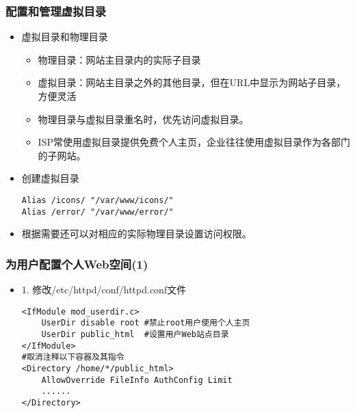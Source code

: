 \documentclass[xcolor=svgnames,presentation]{beamer}
\begin{document}
\begin{frame}[fragile]
\frametitle{配置和管理虚拟目录}
\label{sec-1-14}
\begin{itemize}

\item 虚拟目录和物理目录
\label{sec-1-14-1}%
\begin{itemize}

\item 物理目录：网站主目录内的实际子目录
\label{sec-1-14-1-1}%

\item 虚拟目录：网站主目录之外的其他目录，但在URL中显示为网站子目录，方便灵活
\label{sec-1-14-1-2}%

\item 物理目录与虚拟目录重名时，优先访问虚拟目录。
\label{sec-1-14-1-3}%

\item ISP常使用虚拟目录提供免费个人主页，企业往往使用虚拟目录作为各部门的子网站。
\label{sec-1-14-1-4}%
\end{itemize} %

\item 创建虚拟目录\\
\label{sec-1-14-2}%
\begin{verbatim}
Alias /icons/ "/var/www/icons/"
Alias /error/ "/var/www/error/"
\end{verbatim}

\item 根据需要还可以对相应的实际物理目录设置访问权限。
\label{sec-1-14-3}%
\end{itemize} %
\end{frame}
\begin{frame}[fragile]
\frametitle{为用户配置个人Web空间(1)}
\label{sec-1-15}
\begin{itemize}

\item 1. 修改/etc/httpd/conf/httpd.conf文件\\
\label{sec-1-15-1}%
\begin{verbatim}
<IfModule mod_userdir.c>
    UserDir disable root #禁止root用户使用个人主页
    UserDir public_html  #设置用户Web站点目录
</IfModule>
#取消注释以下容器及其指令
<Directory /home/*/public_html>
    AllowOverride FileInfo AuthConfig Limit
    ......
</Directory>
\end{verbatim}
\end{itemize} %
\end{frame}
\end{document}
